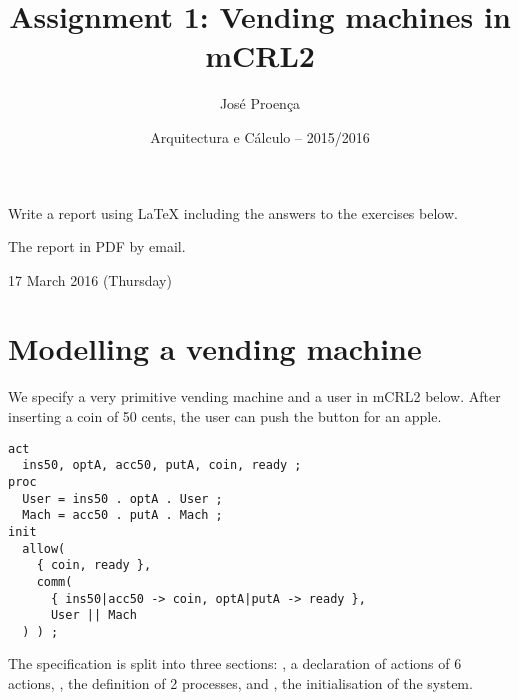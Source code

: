 \documentclass[11pt]{article}
\date{Arquitectura e C\'alculo -- 2015/2016}
\begin{document}
 
 
\title{Assignment 1: Vending machines in mCRL2}
\author{Jos\'{e} Proen\c{c}a} 


\maketitle


 Write a report using LaTeX including the answers to the exercises below.

 The report in PDF by email.

 17 March 2016 (Thursday)
 
\section*{Modelling a vending machine}

\begin{exercise} \label{ex:vm1}
We specify a very primitive vending machine and a user in mCRL2 below. 
After inserting a coin of 50 cents, the user can push the button for an apple.

\begin{lstlisting}
act
  ins50, optA, acc50, putA, coin, ready ;
proc
  User = ins50 . optA . User ;
  Mach = acc50 . putA . Mach ;
init
  allow(
    { coin, ready },
    comm(
      { ins50|acc50 -> coin, optA|putA -> ready },
      User || Mach
  ) ) ;  
\end{lstlisting}  

The specification is split into three sections:
, a declaration of actions of 6 actions,
, the definition of 2 processes, and
, the initialisation of the system.





\end{exercise}
\end{document}
